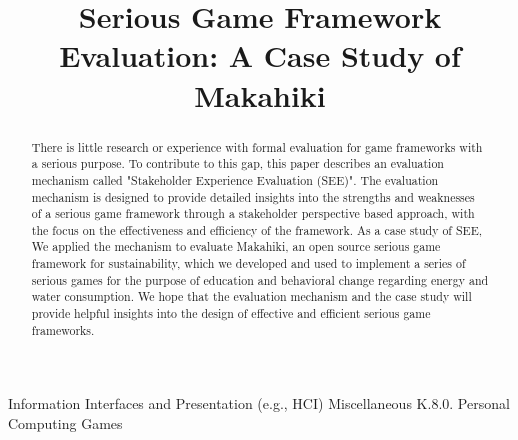 \documentclass{sigchi}
\begin{document}
\title{Serious Game Framework Evaluation: A Case Study of Makahiki}


\maketitle

\begin{abstract}
There is little research or experience with formal evaluation for game frameworks with a serious purpose. To contribute to this gap, this paper describes an evaluation mechanism called "Stakeholder Experience Evaluation (SEE)". The evaluation mechanism is designed to provide detailed insights into the strengths and weaknesses of a serious game framework through a stakeholder perspective based approach, with the focus on the effectiveness and efficiency of the framework. As a case study of SEE, We applied the mechanism to evaluate Makahiki, an open source serious game framework for sustainability, which we developed and used to implement a series of serious games for the purpose of education and behavioral change regarding energy and water consumption. We hope that the evaluation mechanism and the case study will provide helpful insights into the design of effective and efficient serious game frameworks.

\end{abstract}


 {Information Interfaces and Presentation (e.g., HCI)} {Miscellaneous}
 {K.8.0.} {Personal Computing} {Games}

\end{document}

